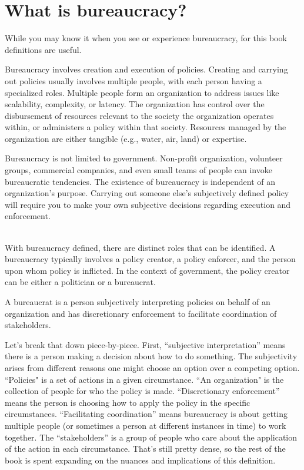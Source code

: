 \section{What is bureaucracy?\label{sec:define_bureaucracy}}

While you may know it when you see or experience bureaucracy, for this book definitions are useful. 

Bureaucracy involves creation and execution of policies. Creating and carrying out policies usually involves multiple people, with each person having a specialized roles. Multiple people form an organization to address issues like scalability, complexity, or latency. The organization has control over the disbursement of resources relevant to the society the organization operates within, or administers a policy within that society. Resources managed by the organization are either tangible (e.g., water, air, land) or expertise.  

Bureaucracy is not limited to government. Non-profit organization, volunteer groups, commercial companies, and even small teams of people can invoke bureaucratic tendencies. The existence of bureaucracy is independent of an organization's purpose. Carrying out someone else's subjectively defined policy will require you to make your own subjective decisions regarding execution and enforcement. 

\ \\

With bureaucracy defined, there are distinct roles that can be identified.
A bureaucracy typically involves a policy creator, a policy enforcer, and the person upon whom policy is inflicted. In the context of government, the policy creator can be either a politician or a bureaucrat. 

A \gls{bureaucrat} is a person subjectively interpreting policies on behalf of an organization and has discretionary enforcement to facilitate coordination of stakeholders. 

Let's break that down piece-by-piece. First, ``subjective interpretation'' means there is a person making a decision about how to do something. The subjectivity arises from different reasons one might choose an option over a competing option.  ``Policies" is a set of actions in a given circumstance. ``An \gls{organization}" is the collection of people for who the policy is made. ``Discretionary enforcement'' means the person is choosing how to apply the policy in the specific circumstances. ``Facilitating coordination'' means bureaucracy is about getting multiple people (or sometimes a person at different instances in time) to work together. The ``stakeholders'' is a group of people who care about the application of the action in each circumstance.  That's still pretty dense, so the rest of the book is spent expanding on the nuances and implications of this definition.

